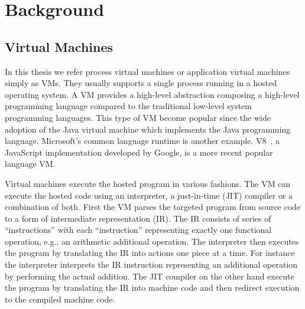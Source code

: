 \chapter{Background}
\label{chp:ch2-background}

\section{Virtual Machines}
\label{sec:ch2-virtual-machines}

In this thesis we refer process virtual machines or application virtual machines simply as VMs.
They usually supports a single process running in a hosted operating system.
A VM provides a high-level abstraction composing a high-level programming language compared to the traditional low-level system programming languages.
This type of VM become popular since the wide adoption of the Java virtual machine which implements the Java programming language.
Microsoft's common language runtime is another example.
V8~\cite{v8}, a JavaScript implementation developed by Google, is a more recent popular language VM.

Virtual machines execute the hosted program in various fashions.
The VM can execute the hosted code using an interpreter, a just-in-time (JIT) compiler or a combination of both.
First the VM parses the targeted program from source code to a form of intermediate representation (IR).
The IR consists of series of ``instructions'' with each ``instruction'' representing exactly one functional operation, e.g., an arithmetic additional operation.
The interpreter then executes the program by translating the IR into actions one piece at a time.
For instance the interpreter interprets the IR instruction representing an additional operation by performing the actual addition.
The JIT compiler on the other hand execute the program by translating the IR into machine code and then redirect execution to the compiled machine code.

